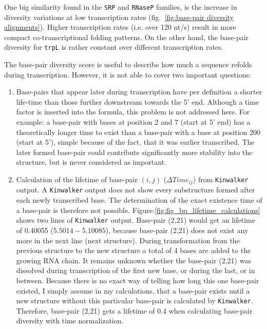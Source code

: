 \documentclass[ twoside,openright,titlepage,numbers=noenddot,headinclude,%
                footinclude=false, cleardoublepage=empty,abstractoff, %
                BCOR=5mm,paper=a4,fontsize=11pt,%
                ngerman,american,%
                ]{scrreprt}
\begin{document}
One big similarity found in the \texttt{SRP} and \texttt{RNaseP} families, is the increase in
diversity variations at low transcription rates (fig.~\ref{fig:base-pair
  diversity alignments}). Higher transcription rates (i.e. over 120 nt/s)
result in more compact co-transcriptional folding patterns. On the
other hand, the base-pair diversity for \texttt{trpL} is rather constant over different
transcription rates.

The base-pair diversity score is useful to describe how much a sequence
refolds during transcription. However, it is not able to cover two
important questions:

\begin{enumerate}
\item Base-pairs that appear later during transcription have per definition
  a shorter life-time than those further downstream towards the 5' end.
  Although a time factor is inserted into the formula, this problem is not
  addressed here. For example: a base-pair with bases at position 2 and 7
  (start at 5' end) has a theoretically longer time to exist than a
  base-pair with a base at position 200 (start at 5'), simple because of
  the fact, that it was earlier transcribed. The later formed base-pair
  could contribute significantly more stability into the structure, but is
  never considered as important.

\item Calculation of the lifetime of base-pair $(i,j)$ ($\Delta Time_{ij}$) from
  \texttt{Kinwalker} output. A \texttt{Kinwalker} output does not show every
  substructure formed after each newly transcribed base. The determination
  of the exact existence time of a base-pair is therefore not possible.
  Figure:\ref{fig:fig_bp_lifetime_calculations} shows two lines of
  \texttt{Kinwalker} output. Base-pair (2,21) would get an lifetime of
  0.40055 ($5.5014-5.10085$), because base-pair (2,21) does not exist any
  more in the next line (next structure). During transformation from the
  previous structure to the new structure a total of 4 bases are added to
  the growing RNA chain. It remains unknown whether the base-pair (2,21)
  was dissolved during transcription of the first new base, or during the
  last, or in between. Because there is no exact way of telling how long
  this one base-pair existed, I simply assume in my calculations, that a
  base-pair exists until a new structure without this particular base-pair
  is calculated by \texttt{Kinwalker}. Therefore, base-pair (2,21) gets a
  lifetime of 0.4 when calculating base-pair diversity with time normalization.
\end{enumerate} 
			
\end{document}
